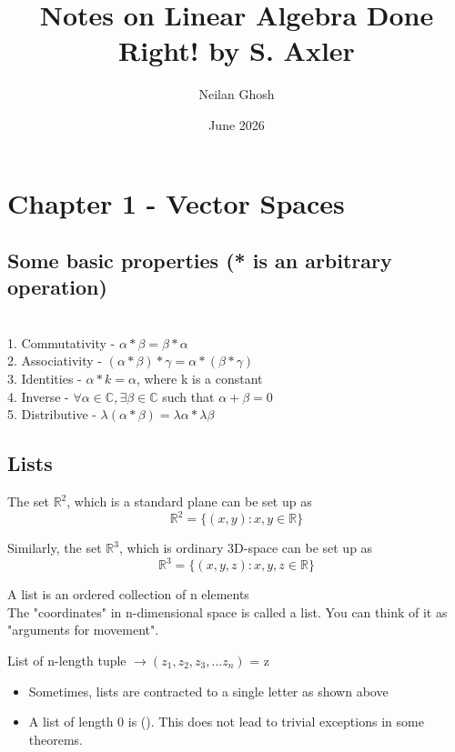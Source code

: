 \documentclass{article}
\title{Notes on Linear Algebra Done Right! by S. Axler}
\author{Neilan Ghosh}
\date{June 2026}
\begin{document}
\maketitle
\section{Chapter 1 - Vector Spaces}
\subsection{Some basic properties (* is an arbitrary operation)} \\
1. Commutativity - $\alpha * \beta = \beta * \alpha$ \\
2. Associativity - $(\alpha*\beta)*\gamma = \alpha*(\beta*\gamma)$ \\
3. Identities - $\alpha * k = \alpha$, where k is a constant \\
4. Inverse - $\forall \alpha \in \mathbb{C}, \exists \beta \in \mathbb{C}$ such that $\alpha + \beta = 0$ \\
5. Distributive - $\lambda(\alpha*\beta) = \lambda\alpha * \lambda\beta$ \\
\subsection{Lists}
The set $\mathbb{R}^{2}$, which is a standard plane can be set up as \\
\begin{equation}
    \mathbb{R}^2 = \{(x,y): x,y \in \mathbb{R}\}
\end{equation}

Similarly, the set $\mathbb{R}^3$, which is ordinary 3D-space can be set up as
\begin{equation}
    \mathbb{R}^3 = \{(x,y,z): x,y,z \in \mathbb{R}\}
\end{equation}

A list is an ordered collection of n elements \\ 
The "coordinates" in n-dimensional space is called a list. You can think of it as "arguments for movement". \\
\begin{center}
    List of n-length tuple $\rightarrow (z_1, z_2, z_3,...z_n)$ = z 
\end{center}
\begin{itemize}
    \item Sometimes, lists are contracted to a single letter as shown above 
    \item A list of length 0 is (). This does not lead to trivial exceptions in some theorems. 
\end{itemize}
\end{document}
